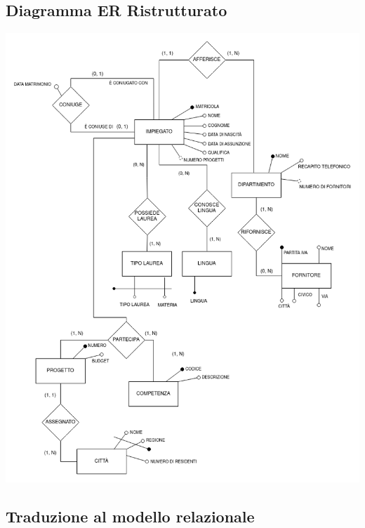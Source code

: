 \documentclass{article}
\begin{document}
\subsection{Diagramma ER Ristrutturato}
\includegraphics[width=\textwidth]{er_R.png}

\newpage

\subsection{Traduzione al modello relazionale}
\end{document}
